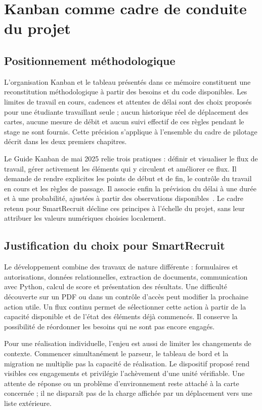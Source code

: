 \section{Kanban comme cadre de conduite du projet}
\label{sec:cadre-kanban}

\subsection{Positionnement méthodologique}

L'organisation Kanban et le tableau présentés dans ce mémoire constituent une reconstitution méthodologique à partir des besoins et du code disponibles. Les limites de travail en cours, cadences et attentes de délai sont des choix proposés pour une étudiante travaillant seule ; aucun historique réel de déplacement des cartes, aucune mesure de débit et aucun suivi effectif de ces règles pendant le stage ne sont fournis. Cette précision s'applique à l'ensemble du cadre de pilotage décrit dans les deux premiers chapitres.

Le Guide Kanban de mai 2025 relie trois pratiques : définir et visualiser le flux de travail, gérer activement les éléments qui y circulent et améliorer ce flux. Il demande de rendre explicites les points de début et de fin, le contrôle du travail en cours et les règles de passage. Il associe enfin la prévision du délai à une durée et à une probabilité, ajustées à partir des observations disponibles~\cite{kanban-guide2025}. Le cadre retenu pour SmartRecruit décline ces principes à l'échelle du projet, sans leur attribuer les valeurs numériques choisies localement.

\subsection{Justification du choix pour SmartRecruit}

Le développement combine des travaux de nature différente : formulaires et autorisations, données relationnelles, extraction de documents, communication avec Python, calcul de score et présentation des résultats. Une difficulté découverte sur un PDF ou dans un contrôle d'accès peut modifier la prochaine action utile. Un flux continu permet de sélectionner cette action à partir de la capacité disponible et de l'état des éléments déjà commencés. Il conserve la possibilité de réordonner les besoins qui ne sont pas encore engagés.

Pour une réalisation individuelle, l'enjeu est aussi de limiter les changements de contexte. Commencer simultanément le parseur, le tableau de bord et la migration ne multiplie pas la capacité de réalisation. Le dispositif proposé rend visibles ces engagements et privilégie l'achèvement d'une unité vérifiable. Une attente de réponse ou un problème d'environnement reste attaché à la carte concernée ; il ne disparaît pas de la charge affichée par un déplacement vers une liste extérieure.


